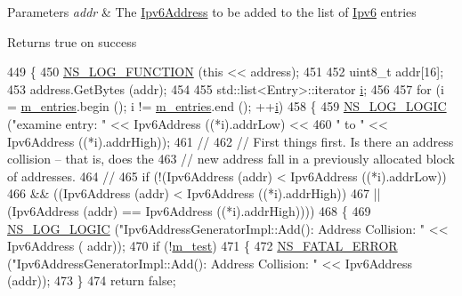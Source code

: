\begin{DoxyParams}{Parameters}
{\em addr} & The \hyperlink{classns3_1_1Ipv6Address}{Ipv6\+Address} to be added to the list of \hyperlink{classns3_1_1Ipv6}{Ipv6} entries \\
\hline
\end{DoxyParams}
\begin{DoxyReturn}{Returns}
true on success 
\end{DoxyReturn}

\begin{DoxyCode}
449 \{
450   \hyperlink{log-macros-disabled_8h_a90b90d5bad1f39cb1b64923ea94c0761}{NS\_LOG\_FUNCTION} (\textcolor{keyword}{this} << address);
451 
452   uint8\_t addr[16];
453   address.GetBytes (addr);
454 
455   std::list<Entry>::iterator \hyperlink{bernuolliDistribution_8m_a6f6ccfcf58b31cb6412107d9d5281426}{i};
456 
457   \textcolor{keywordflow}{for} (i = \hyperlink{classns3_1_1Ipv6AddressGeneratorImpl_ab7b8cc4871178edafc571d7a9449fef1}{m\_entries}.begin (); i != \hyperlink{classns3_1_1Ipv6AddressGeneratorImpl_ab7b8cc4871178edafc571d7a9449fef1}{m\_entries}.end (); ++\hyperlink{bernuolliDistribution_8m_a6f6ccfcf58b31cb6412107d9d5281426}{i})
458     \{
459       \hyperlink{group__logging_ga88acd260151caf2db9c0fc84997f45ce}{NS\_LOG\_LOGIC} (\textcolor{stringliteral}{"examine entry: "} << Ipv6Address ((*i).addrLow) <<
460                     \textcolor{stringliteral}{" to "} << Ipv6Address ((*i).addrHigh));
461       \textcolor{comment}{//}
462       \textcolor{comment}{// First things first.  Is there an address collision -- that is, does the}
463       \textcolor{comment}{// new address fall in a previously allocated block of addresses.}
464       \textcolor{comment}{//}
465       \textcolor{keywordflow}{if} (!(Ipv6Address (addr) < Ipv6Address ((*i).addrLow))
466           && ((Ipv6Address (addr) < Ipv6Address ((*i).addrHigh))
467               || (Ipv6Address (addr) == Ipv6Address ((*i).addrHigh))))
468         \{
469           \hyperlink{group__logging_ga88acd260151caf2db9c0fc84997f45ce}{NS\_LOG\_LOGIC} (\textcolor{stringliteral}{"Ipv6AddressGeneratorImpl::Add(): Address Collision: "} << Ipv6Address (
      addr));
470           \textcolor{keywordflow}{if} (!\hyperlink{classns3_1_1Ipv6AddressGeneratorImpl_a6538e5a709f4060466c5253a0289cdf8}{m\_test})
471             \{
472               \hyperlink{group__fatal_ga5131d5e3f75d7d4cbfd706ac456fdc85}{NS\_FATAL\_ERROR} (\textcolor{stringliteral}{"Ipv6AddressGeneratorImpl::Add(): Address Collision: "} << 
      Ipv6Address (addr));
473             \}
474           \textcolor{keywordflow}{return} \textcolor{keyword}{false};

\end{DoxyCode}
